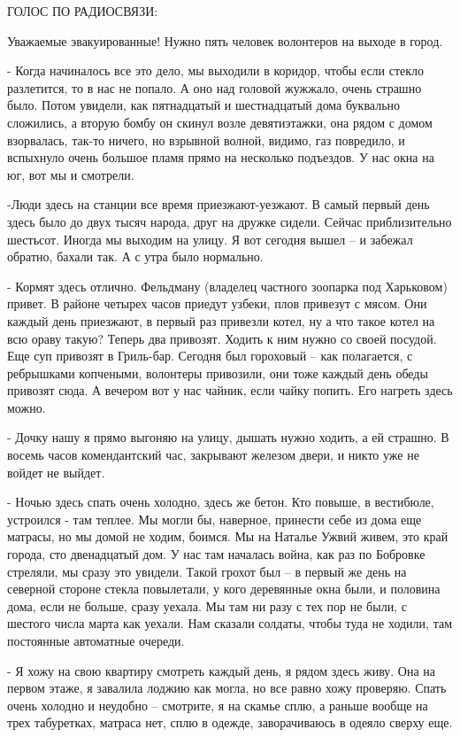 ГОЛОС ПО РАДИОСВЯЗИ:

Уважаемые эвакуированные! Нужно пять человек волонтеров на выходе в город.

- Когда начиналось все это дело, мы выходили в коридор, чтобы если стекло
разлетится, то в нас не попало. А оно над головой жужжало, очень страшно было.
Потом увидели, как пятнадцатый и шестнадцатый дома буквально сложились, а
вторую бомбу он скинул возле девятиэтажки, она рядом с домом взорвалась, так-то
ничего, но взрывной волной, видимо, газ повредило, и вспыхнуло очень большое
пламя прямо на несколько подъездов. У нас окна на юг, вот мы и смотрели.

-Люди здесь на станции все время приезжают-уезжают. В самый первый день здесь
было до двух тысяч народа, друг на дружке сидели. Сейчас приблизительно
шестьсот. Иногда мы выходим на улицу. Я вот сегодня вышел – и забежал обратно,
бахали так. А с утра было нормально.

- Кормят здесь отлично. Фельдману (владелец частного зоопарка под Харьковом)
привет. В районе четырех часов приедут узбеки, плов привезут с мясом. Они
каждый день приезжают, в первый раз привезли котел, ну а что такое котел на всю
ораву такую? Теперь два привозят. Ходить к ним нужно со своей посудой. Еще суп
привозят в Гриль-бар. Сегодня был гороховый – как полагается, с ребрышками
копчеными, волонтеры привозили, они тоже каждый день обеды привозят сюда. А
вечером вот у нас чайник, если чайку попить. Его нагреть здесь можно. 

- Дочку нашу я прямо выгоняю на улицу, дышать нужно ходить, а ей страшно. В
восемь часов комендантский час, закрывают железом двери, и никто уже не войдет
не выйдет.

- Ночью здесь спать очень холодно, здесь же бетон. Кто повыше, в вестибюле,
устроился - там теплее. Мы могли бы, наверное, принести себе из дома еще
матрасы, но мы домой не ходим, боимся. Мы на Наталье Ужвий живем, это край
города, сто двенадцатый дом. У нас там началась война, как раз по Бобровке
стреляли, мы сразу это увидели. Такой грохот был – в первый же день на северной
стороне стекла повылетали, у кого деревянные окна были, и половина дома, если
не больше, сразу уехала. Мы там ни разу с тех пор не были, с шестого числа
марта как уехали. Нам сказали солдаты, чтобы туда не ходили, там постоянные
автоматные очереди.

- Я хожу на свою квартиру смотреть каждый день, я рядом здесь живу. Она на
первом этаже, я завалила лоджию как могла, но все равно хожу проверяю. Спать
очень холодно и неудобно – смотрите, я на скамье сплю, а раньше вообще на трех
табуретках, матраса нет, сплю в одежде, заворачиваюсь в одеяло сверху еще.

